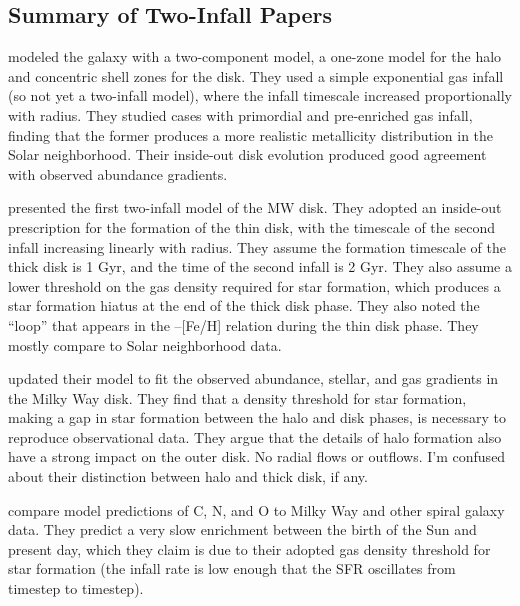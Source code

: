 \subsection{Summary of Two-Infall Papers}


\citet{matteucci_galactic_1989} modeled the galaxy with a two-component model, a one-zone model for the halo and concentric shell zones for the disk. They used a simple exponential gas infall (so not yet a two-infall model), where the infall timescale increased proportionally with radius. They studied cases with primordial and pre-enriched gas infall, finding that the former produces a more realistic metallicity distribution in the Solar neighborhood. Their inside-out disk evolution produced good agreement with observed abundance gradients.

\citet{chiappini_chemical_1997} presented the first two-infall model of the MW disk. They adopted an inside-out prescription for the formation of the thin disk, with the timescale of the second infall increasing linearly with radius. They assume the formation timescale of the thick disk is 1 Gyr, and the time of the second infall is 2 Gyr. They also assume a lower threshold on the gas density required for star formation, which produces a star formation hiatus at the end of the thick disk phase. They also noted the ``loop'' that appears in the \aFe--[Fe/H] relation during the thin disk phase. They mostly compare to Solar neighborhood data.

\citet{chiappini_abundance_2001} updated their model to fit the observed abundance, stellar, and gas gradients in the Milky Way disk. They find that a density threshold for star formation, making a gap in star formation between the halo and disk phases, is necessary to reproduce observational data. They argue that the details of halo formation also have a strong impact on the outer disk. No radial flows or outflows. I'm confused about their distinction between halo and thick disk, if any.

\citet{chiappini_oxygen_2003} compare model predictions of C, N, and O to Milky Way and other spiral galaxy data. They predict a very slow enrichment between the birth of the Sun and present day, which they claim is due to their adopted gas density threshold for star formation (the infall rate is low enough that the SFR oscillates from timestep to timestep).

